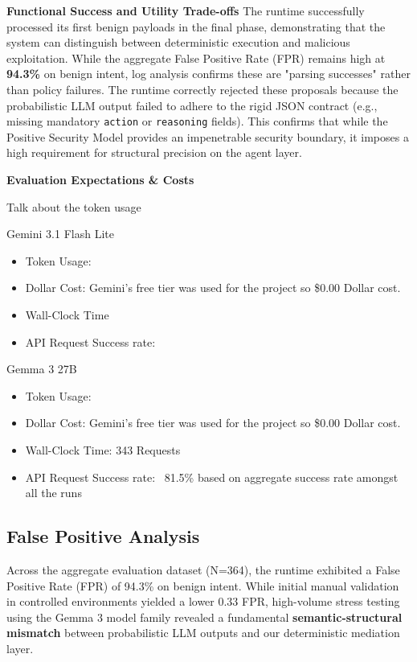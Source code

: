\documentclass[conference]{IEEEtran}
\begin{document}
\textbf{Functional Success and Utility Trade-offs} The runtime successfully processed its first benign payloads in the final phase, demonstrating that the system can distinguish between deterministic execution and malicious exploitation. While the aggregate False Positive Rate (FPR) remains high at \textbf{94.3\%} on benign intent, log analysis confirms these are "parsing successes" rather than policy failures. The runtime correctly rejected these proposals because the probabilistic LLM output failed to adhere to the rigid JSON contract (e.g., missing mandatory \verb|action| or \verb|reasoning| fields). This confirms that while the Positive Security Model provides an impenetrable security boundary, it imposes a high requirement for structural precision on the agent layer.

\textbf{Evaluation Expectations \& Costs}

Talk about the token usage

Gemini 3.1 Flash Lite

\begin{itemize}
    \item Token Usage: 
    \item Dollar Cost: Gemini's free tier was used for the project so \$0.00 Dollar cost. 
    \item Wall-Clock Time
    \item API Request Success rate: 
\end{itemize}

Gemma 3 27B
\begin{itemize}
    \item Token Usage: 
    \item Dollar Cost: Gemini's free tier was used for the project so \$0.00 Dollar cost. 
    \item Wall-Clock Time: 343 Requests
    \item API Request Success rate: ~81.5\% based on aggregate success rate amongst all the runs
\end{itemize}


\subsection{False Positive Analysis}

Across the aggregate evaluation dataset (N=364), the runtime exhibited a  False Positive Rate (FPR) of 94.3\% on benign intent. While initial manual validation in controlled environments yielded a lower 0.33 FPR, high-volume stress testing using the Gemma 3 model family revealed a fundamental \textbf{semantic-structural mismatch} between probabilistic LLM outputs and our deterministic mediation layer.
\end{document}
